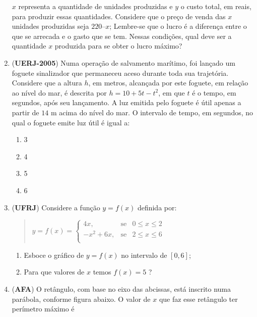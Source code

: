 \begin{enumerate}
\(x\) representa a quantidade de unidades produzidas e \(y\) o custo total, em reais, para produzir essas quantidades.
Considere que o preço de venda das \(x\) unidades produzidas seja \(220 – x\); Lembre-se que o lucro é a diferença entre o que se arrecada e o gasto que se tem. Nessas condições, qual deve ser a quantidade \(x\) produzida para se obter o lucro máximo?

\item (\textbf{UERJ-2005}) Numa operação de salvamento marítimo, foi lançado um foguete sinalizador que permaneceu aceso durante toda sua trajetória. Considere que a altura \(h\), em metros, alcançada por este foguete, em relação ao nível do mar, é descrita por \(h = 10 + 5t - t^2\), em que \(t\) é o tempo, em segundos, após seu lançamento. A luz emitida pelo foguete é útil apenas a partir de \(14\) m acima do nível do mar. O intervalo de tempo, em segundos, no qual o foguete emite luz útil é igual a:
\begin{enumerate}
\item 3
\item 4
\item 5
\item 6
\end{enumerate}

\item (\textbf{UFRJ}) Considere a função \(y = f(x)\) definida por:
\begin{quote}

\(y = f(x) = \left\{ \begin{array}{rlll} 4x, & \text{se} & 0 \leq x \leq 2 \\ -x^2+6x, & \text{se} & 2 \leq x \leq 6 \\ \end{array} \right.\)
\end{quote}
\begin{enumerate}
\item {} 
Esboce o gráfico de \(y = f(x)\) no intervalo de \([0,6]\);

\item {} 
Para que valores de \(x\) temos \(f(x) = 5\) ?

\end{enumerate}

\clearpage
\item (\textbf{AFA}) O retângulo, com base no eixo das abcissas, está inscrito numa parábola, conforme figura abaixo. O valor de  \(x\)  que faz esse retângulo ter perímetro máximo é
\begin{figure}[H]
\centering


\end{figure}
\end{enumerate}
